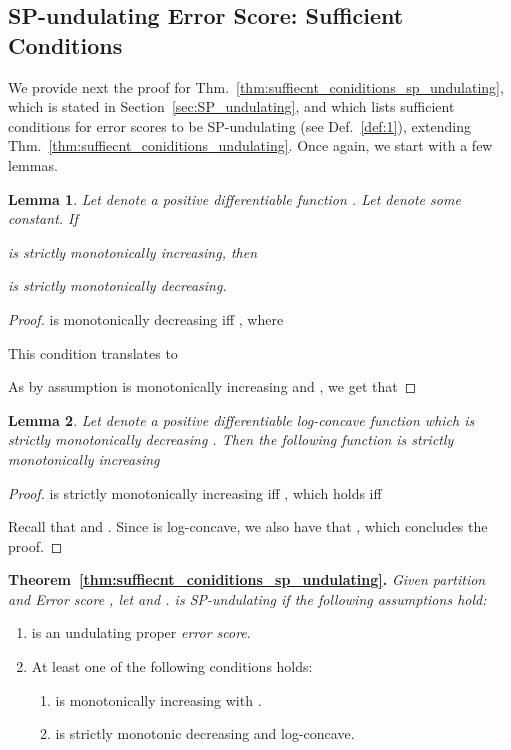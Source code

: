\documentclass{article}
\newtheorem{lemma}{Lemma}
\begin{document}
\subsection{SP-undulating Error Score: Sufficient Conditions}
\label{app:proof_thm_3}

We provide next the proof for Thm.~\ref{thm:suffiecnt_coniditions_sp_undulating}, which is stated in Section~\ref{sec:SP_undulating}, and which lists sufficient conditions for error scores to be SP-undulating (see Def.~\ref{def:1}), extending Thm.~\ref{thm:suffiecnt_coniditions_undulating}. Once again, we start with a few lemmas.

\begin{lemma}
\label{thm:1_crossing_point}
Let  denote a positive differentiable function . Let  denote some constant. If

is strictly monotonically increasing, then

is strictly monotonically decreasing.
\end{lemma}

\begin{proof}

 is monotonically decreasing iff , where

This condition translates to

As by assumption  is monotonically increasing and , we get that 

\end{proof}

\begin{lemma}
\label{thm:log-concave_is_monotinic}
Let  denote a positive differentiable log-concave function which is strictly monotonically decreasing . Then the following function is strictly monotonically increasing

\end{lemma}
\begin{proof}
 is strictly monotonically increasing iff , which holds iff

Recall that  and . Since  is log-concave, we also have that , which concludes the proof.
\end{proof}

\noindent
{\textbf{Theorem~\ref{thm:suffiecnt_coniditions_sp_undulating}.} \textit{Given partition  and Error score , let  and .   is SP-undulating if the following assumptions hold:}
\begin{enumerate}\item  is an undulating proper \emph{error score}.
\label{ass:1}
\item At least one of the following conditions holds:
\label{ass:2}
\begin{enumerate}
\item \label{ass:2-1}
 is
monotonically increasing with .
\item \label{ass:2-2}
 is strictly monotonic decreasing and log-concave. 
\end{enumerate}

\end{enumerate}
}
\end{document}
